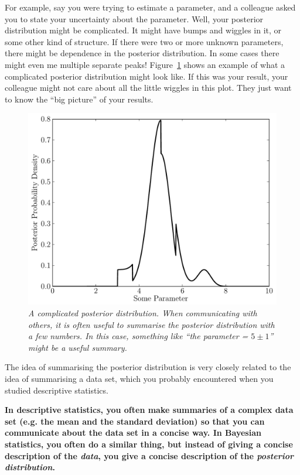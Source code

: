 For example, say you were trying to estimate
a parameter, and a colleague asked you to state your uncertainty about the
parameter. Well, your posterior distribution might be complicated. It might
have bumps and wiggles in it, or some other kind of structure. If there were
two or more unknown parameters, there might be dependence in the posterior
distribution. In some cases there might even me multiple separate peaks!
Figure~\ref{fig:complicated_posterior} shows an example of what a complicated
posterior distribution might look like. If this was your result, your colleague
might not care about all the little wiggles in this plot. They just want to know
the ``big picture'' of your results.
\begin{figure}[h!]
\begin{center}
\includegraphics[scale=0.6]{Figures/complicated_posterior.pdf}
\caption{\it A complicated posterior distribution. When communicating with others,
it is often useful to summarise the posterior distribution with a few numbers. In
this case, something like ``the parameter = $5 \pm 1$'' might be a useful summary.
\label{fig:complicated_posterior}}
\end{center}
\end{figure}

The idea of summarising the posterior distribution is very closely related to
the idea of summarising a data set, which you probably encountered when you
studied descriptive statistics.
\begin{framed}
{\bf In descriptive statistics, you often make summaries of a complex data set
(e.g. the mean and the standard deviation) so that you can communicate about
the data set in a concise way. In Bayesian statistics, you often do a similar
thing, but instead of giving a concise description of the {\it data}, you give a
concise description of the {\it posterior distribution}.}
\end{framed}

